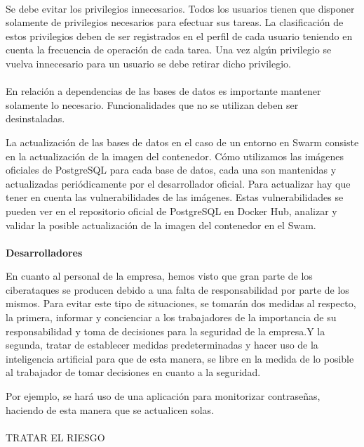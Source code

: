 \paragraph{}
Se debe evitar los privilegios innecesarios. Todos los usuarios tienen
que disponer solamente de privilegios necesarios para efectuar sus
tareas. La clasificación de estos privilegios deben de ser registrados
en el perfil de cada usuario teniendo en cuenta la frecuencia de
operación de cada tarea. Una vez algún privilegio se vuelva
innecesario para un usuario se debe retirar dicho privilegio.
\paragraph{}
En relación a dependencias de las bases de datos es importante
mantener solamente lo necesario. Funcionalidades que no se utilizan
deben ser desinstaladas.

La actualización de las bases de datos en el caso de un entorno en
Swarm consiste en la actualización de la imagen del contenedor. Cómo
utilizamos las imágenes oficiales de PostgreSQL para cada base de
datos, cada una son mantenidas y actualizadas periódicamente por el
desarrollador oficial. Para actualizar hay que tener en cuenta las
vulnerabilidades de las imágenes. Estas vulnerabilidades se pueden ver
en el repositorio oficial de PostgreSQL en Docker Hub, analizar y
validar la posible actualización de la imagen del contenedor en el
Swam.
\paragraph{}
\textbf{Desarrolladores}

En cuanto al personal de la empresa, hemos visto que gran parte de los
ciberataques se producen debido a una falta de responsabilidad por
parte de los mismos. Para evitar este tipo de situaciones, se tomarán
dos medidas al respecto, la primera, informar y concienciar a los
trabajadores de la importancia de su responsabilidad y toma de
decisiones para la seguridad de la empresa.Y la segunda, tratar de
establecer medidas predeterminadas y hacer uso de la inteligencia
artificial para que de esta manera, se libre en la medida de lo
posible al trabajador de tomar decisiones en cuanto a la seguridad.

Por ejemplo, se hará uso de una aplicación para monitorizar
contraseñas, haciendo de esta manera que se actualicen solas.
\paragraph{}
TRATAR EL RIESGO
